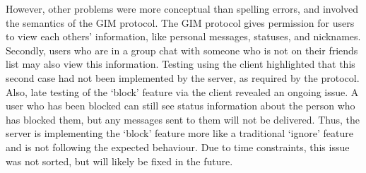 However, other problems were more conceptual than spelling errors, and involved the semantics of the GIM protocol. The GIM protocol gives permission for users to view each others' information, like personal messages, statuses, and nicknames. Secondly, users who are in a group chat with someone who is not on their friends list may also view this information. Testing using the client highlighted that this second case had not been implemented by the server, as required by the protocol. Also, late testing of the `block' feature via the client revealed an ongoing issue. A user who has been blocked can still see status information about the person who has blocked them, but any messages sent to them will not be delivered. Thus, the server is implementing the `block' feature more like a traditional `ignore' feature and is not following the expected behaviour. Due to time constraints, this issue was not sorted, but will likely be fixed in the future.
